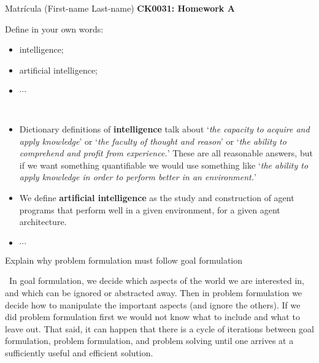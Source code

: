 \documentclass[11pt]{article}
\newenvironment{EX}[2][Exercise]{\begin{trivlist}
\item[{\color{red} \hskip \labelsep {\bfseries #1}\hskip \labelsep {\bfseries #2.}}]}{\end{trivlist}}
\newenvironment{SL}[1][Solution]{\begin{trivlist}
\item[{\color{blue} \hskip \labelsep {\bfseries #1:}}]}{\end{trivlist}}
\begin{document}

\noindent Matr\'icula (First-name Last-name) \hfill {\Large \bfseries CK0031: Homework A} \\

\begin{EX}{A.1}
 Define in your own words:
 \begin{itemize}
  \item[a)] intelligence;
  \item[b)] artificial intelligence;
  \item[c)] $\cdots$
 \end{itemize}
\end{EX}

\begin{SL}\
 \begin{itemize}
  \item[a)] Dictionary definitions of \textbf{intelligence} talk about `\textit{the capacity to acquire and apply knowledge}' or `\textit{the faculty of thought and reason}' or `\textit{the ability to comprehend and profit from experience.}' These are all reasonable answers, but if we want something quantifiable we would use something like `\textit{the ability to apply knowledge in order to perform better in an environment.}' 
  \item[b)] We define \textbf{artificial intelligence} as the study and construction of agent programs that perform well in a given environment, for a given agent architecture.
  \item[c)] $\cdots$
 \end{itemize}
\end{SL}


\begin{EX}{A.2}
Explain why problem formulation must follow goal formulation
\end{EX}

\begin{SL}\
In goal formulation, we decide which aspects of the world we are interested in, and which can be ignored or abstracted away. Then in problem formulation we decide how to manipulate the important aspects (and ignore the others). If we did problem formulation first we would not know what to include and what to leave out. That said, it can happen that there is a cycle of iterations between goal formulation, problem formulation, and problem solving until one arrives at a sufficiently useful and efficient solution.
\end{SL}
\end{document}

